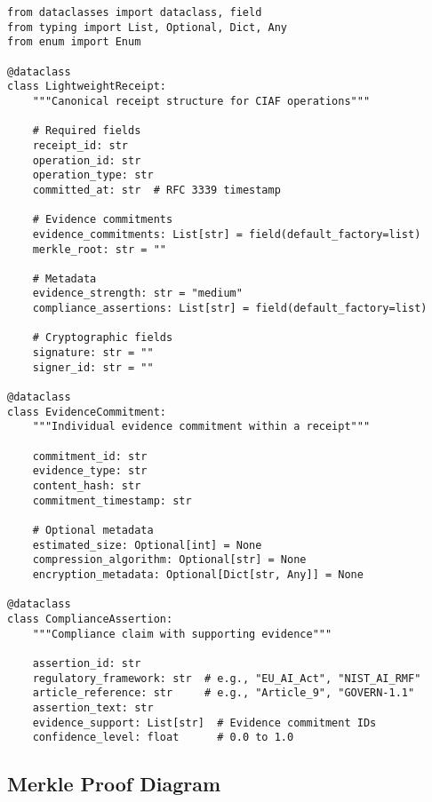 \documentclass[12pt,a4paper]{article}
\begin{document}
\begin{lstlisting}[caption=Core CIAF Data Structures]
from dataclasses import dataclass, field
from typing import List, Optional, Dict, Any
from enum import Enum

@dataclass
class LightweightReceipt:
    """Canonical receipt structure for CIAF operations"""
    
    # Required fields
    receipt_id: str
    operation_id: str
    operation_type: str
    committed_at: str  # RFC 3339 timestamp
    
    # Evidence commitments
    evidence_commitments: List[str] = field(default_factory=list)
    merkle_root: str = ""
    
    # Metadata
    evidence_strength: str = "medium"
    compliance_assertions: List[str] = field(default_factory=list)
    
    # Cryptographic fields
    signature: str = ""
    signer_id: str = ""

@dataclass
class EvidenceCommitment:
    """Individual evidence commitment within a receipt"""
    
    commitment_id: str
    evidence_type: str
    content_hash: str
    commitment_timestamp: str
    
    # Optional metadata
    estimated_size: Optional[int] = None
    compression_algorithm: Optional[str] = None
    encryption_metadata: Optional[Dict[str, Any]] = None

@dataclass  
class ComplianceAssertion:
    """Compliance claim with supporting evidence"""
    
    assertion_id: str
    regulatory_framework: str  # e.g., "EU_AI_Act", "NIST_AI_RMF"
    article_reference: str     # e.g., "Article_9", "GOVERN-1.1"
    assertion_text: str
    evidence_support: List[str]  # Evidence commitment IDs
    confidence_level: float      # 0.0 to 1.0
\end{lstlisting}

\subsection{Merkle Proof Diagram}
\end{document}
